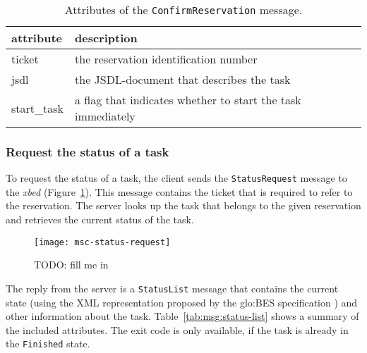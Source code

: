 \bigskip

\begin{table}[ht]
  \centering
  \begin{tabular}{@{}lp{}@{}}\toprule
    attribute        & \multicolumn{1}{l}{description} \\ \midrule %
    ticket           &  the reservation identification number \\
    jsdl             & the JSDL-document that describes the task \\
    start\_task      & a flag that indicates whether to start the task immediately  \\
    \bottomrule
  \end{tabular}
  \caption{Attributes of the \texttt{ConfirmReservation} message.}
  \label{tab:msg:confirm-reservation}
\end{table}

\subsubsection{Request the status of a task}

To   request   the   status   of    a   task,   the   client   sends   the
\texttt{StatusRequest}       message        to       the       \emph{xbed}
(Figure~\ref{fig:msc-status-request}).   This message contains  the ticket
that is  required to refer  to the reservation.   The server looks  up the
task  that belongs  to the  given  reservation and  retrieves the  current
status of the task.

\begin{figure}[ht]
  \centering
  \texttt{[image: msc-status-request]}
  \caption[MSC Request Task Status]{TODO: fill me in}
  \label{fig:msc-status-request}
\end{figure}

The reply from  the server is a \texttt{StatusList}  message that contains
the  current   state  (using  the  XML  representation   proposed  by  the
\gls{glo:BES} specification  \cite{ogsa-bes}) and other  information about
the task. Table~\ref{tab:msg:status-list} shows  a summary of the included
attributes.  The  exit code is only  available, if the task  is already in
the \texttt{Finished} state.

